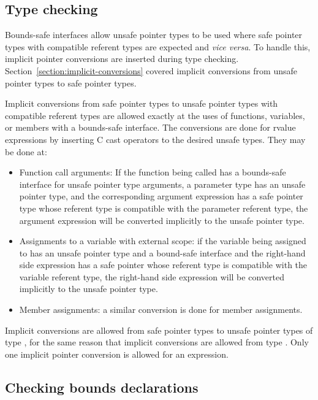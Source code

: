 \subsection{Type checking}

Bounds-safe interfaces allow unsafe pointer types to be used
where safe pointer types with compatible referent types are expected
and {\it vice versa}.
To handle this, implicit pointer conversions are inserted during type checking.
Section~\ref{section:implicit-conversions} covered implicit conversions from unsafe pointer types to safe pointer types.

Implicit conversions from safe pointer types to unsafe pointer types
with compatible referent types are allowed exactly at the uses of functions,
variables, or members with a  bounds-safe interface.  The conversions are done for rvalue expressions by inserting C cast operators to the desired unsafe types.
They may be done at:
\begin{itemize}
\item Function call arguments: If the function being called has a 
      bounds-safe interface for unsafe pointer type arguments, a parameter type 
      has an unsafe pointer type, and the corresponding argument expression has a safe
      pointer type whose referent type is compatible with the parameter
      referent type, the argument expression will be converted implicitly to the 
      unsafe pointer type.
\item Assignments to a variable with external scope: if the variable being
     assigned to has an unsafe pointer type and a bound-safe interface and the
     right-hand side expression has a safe pointer whose referent type is
     compatible with the
     variable referent type, the right-hand side expression will be converted
     implicitly to the unsafe pointer type.
\item
   Member assignments: a similar conversion is done for member assignments.
\end{itemize}

Implicit conversions are allowed from safe pointer types to unsafe pointer
types of type \unsafeptrvoid, for the same reason that implicit conversions
are allowed from type \unsafeptrvoid.  Only one implicit pointer conversion
is allowed for an expression.

\subsection{Checking bounds declarations}
\label{section:checking-bounds-interfaces}

